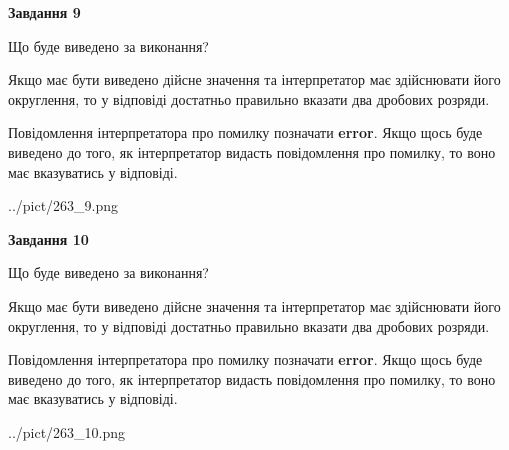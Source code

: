 \documentclass[12pt, ukrainian]{article}
\begin{document}
{\begin {Large}
{\begin {center}\textbf{Завдання 9}\end {center}}\par
Що буде виведено за виконання? \par

Якщо має бути виведено дійсне значення та інтерпретатор має здійснювати його округлення, 
то у відповіді достатньо правильно вказати два дробових розряди.

Повідомлення інтерпретатора про помилку позначати \textbf{error}.
Якщо щось буде виведено до того, як інтерпретатор видасть повідомлення про помилку, 
то воно має вказуватись у відповіді. \par

\begin{center}
	{../pict/263_9.png}
\end{center}
\newpage

{\begin {center}\textbf{Завдання 10}\end {center}}\par
Що буде виведено за виконання? \par

Якщо має бути виведено дійсне значення та інтерпретатор має здійснювати його округлення, 
то у відповіді достатньо правильно вказати два дробових розряди.

Повідомлення інтерпретатора про помилку позначати \textbf{error}.
Якщо щось буде виведено до того, як інтерпретатор видасть повідомлення про помилку, 
то воно має вказуватись у відповіді. \par

\begin{center}
	{../pict/263_10.png}
\end{center}
\newpage

\end {Large}}
\end{document}
